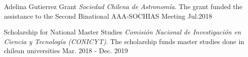 

\begin{cvhonors}
	\cvhonor
	{Adelina Gutierrez Grant} %
	{\textit{Sociedad Chilena de Astronom\'ia}. The grant funded the assistance to the Second Binational AAA-SOCHIAS Meeting} %
	{} %
	{Jul.2018} %
	
	\cvhonor
	{Scholarship for National Master Studies} %
	{\textit{Comisi\'on Nacional de Investigaci\'on en Ciencia y Tecnolog\'ia (CONICYT)}. The scholarship funds master studies done in chilean universities} %
	{} %
	{Mar. 2018 - Dec. 2019} %
	
\end{cvhonors}